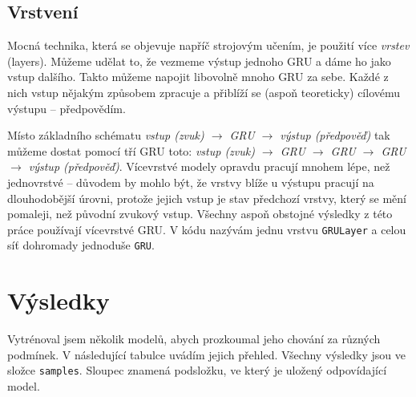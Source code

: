 \documentclass[a4]{article}
\begin{document}
\subsection{Vrstvení}
Mocná technika, která se objevuje napříč strojovým učením, je použití více \textit{vrstev} (layers). Můžeme udělat to, že vezmeme výstup jednoho GRU a dáme ho jako vstup dalšího. Takto můžeme napojit libovolně mnoho GRU za sebe. Každé z nich vstup nějakým způsobem zpracuje a přiblíží se (aspoň teoreticky) cílovému výstupu -- předpovědím.

Místo základního schématu \textit{vstup (zvuk) $\rightarrow$ GRU $\rightarrow$ výstup (předpověď)} tak můžeme dostat pomocí tří GRU toto: \textit{vstup (zvuk) $\rightarrow$ GRU $\rightarrow$ GRU $\rightarrow$ GRU $\rightarrow$ výstup (předpověď)}. Vícevrstvé modely opravdu pracují mnohem lépe, než jednovrstvé -- důvodem by mohlo být, že vrstvy blíže u výstupu pracují na dlouhodobější úrovni, protože jejich vstup je stav předchozí vrstvy, který se mění pomaleji, než původní zvukový vstup. Všechny aspoň obstojné výsledky z této práce používají vícevrstvé GRU. V kódu nazývám jednu vrstvu \verb|GRULayer| a celou síť dohromady jednoduše \verb|GRU|.

\section{Výsledky}
Vytrénoval jsem několik modelů, abych prozkoumal jeho chování za různých podmínek. V následující tabulce uvádím jejich přehled. Všechny výsledky jsou ve složce \verb|samples|. Sloupec  znamená podsložku, ve který je uložený odpovídající model.
\end{document}
